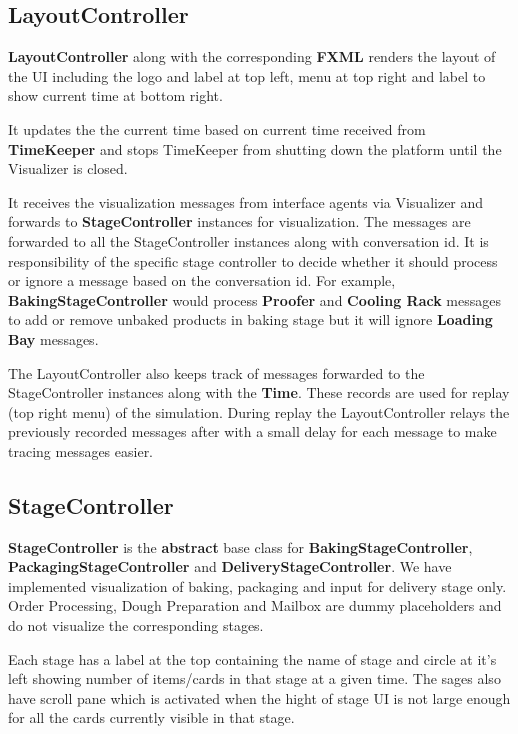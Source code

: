 \documentclass[12pt]{article}
\begin{document}
\subsection{LayoutController}
\textbf{LayoutController} along with the corresponding \textbf{FXML} renders the layout of the UI including the logo and label at top left, menu at top right and label to show current time at bottom right.

It updates the the current time based on current time received from \textbf{TimeKeeper} and stops TimeKeeper from shutting down the platform until the Visualizer is closed.

It receives the visualization messages from interface agents via Visualizer and forwards to \textbf{StageController} instances for visualization. The messages are forwarded to all the StageController instances along with conversation id. It is responsibility of the specific stage controller to decide whether it should process or ignore a message based on the conversation id. For example, \textbf{BakingStageController} would process \textbf{Proofer} and \textbf{Cooling Rack} messages to add or remove unbaked products in baking stage but it will ignore \textbf{Loading Bay} messages.

The LayoutController also keeps track of messages forwarded to the StageController instances along with the \textbf{Time}. These records are used for replay (top right menu) of the simulation. During replay the LayoutController relays the previously recorded messages after with a small delay for each message to make tracing messages easier.

\subsection{StageController}
\textbf{StageController} is the \textbf{abstract} base class for \textbf{BakingStageController}, \textbf{PackagingStageController} and \textbf{DeliveryStageController}. We have implemented visualization of baking, packaging and input for delivery stage only. Order Processing, Dough Preparation and Mailbox are dummy placeholders and do not visualize the corresponding stages.

Each stage has a label at the top containing the name of stage and circle at it's left showing number of items/cards in that stage at a given time. The sages also have scroll pane which is activated when the hight of stage UI is not large enough for all the cards currently visible in that stage.
\end{document}
